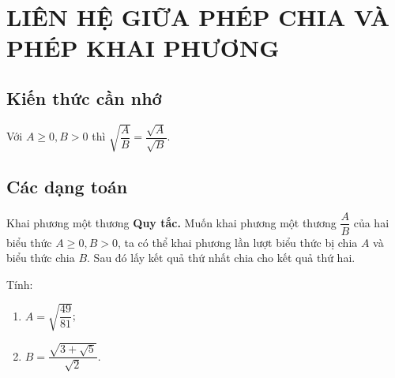 \section{LIÊN HỆ GIỮA PHÉP CHIA VÀ PHÉP KHAI PHƯƠNG}
\subsection{Kiến thức cần nhớ}
    	\begin{dl}
    	Với $ A\ge 0, B>0 $ thì $ \sqrt{\dfrac{A}{B}}=\dfrac{\sqrt{A}}{\sqrt{B}}. $
    \end{dl}   
\subsection{Các dạng toán}
\begin{dang}{Khai phương một thương}
	\textbf{Quy tắc.} Muốn khai phương một thương $ \dfrac{A}{B} $ của hai biểu thức $ A\ge 0, B>0 $, ta có thể khai phương lần lượt biểu thức bị chia $ A $ và biểu thức chia $ B $. Sau đó lấy kết quả thứ nhất chia cho kết quả thứ hai.
\end{dang}
\begin{vd}
	Tính:
	\begin{multicols}{2}
		\begin{enumerate}
			\item $ A=\sqrt{\dfrac{49}{81}} $;
			\item $ B=\dfrac{\sqrt{3+\sqrt{5}}}{\sqrt{2}} .$
		\end{enumerate}
	\end{multicols}
\end{vd}

